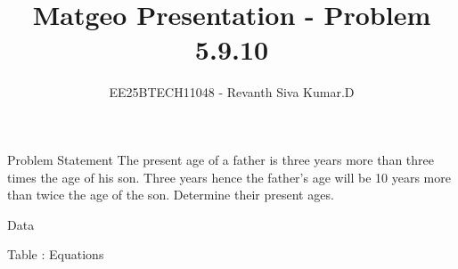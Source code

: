 \documentclass{beamer}
\title{Matgeo Presentation - Problem 5.9.10}
\author{EE25BTECH11048 - Revanth Siva Kumar.D}
\numberwithin{equation}{section}
\theoremstyle{remark}
\begin{document}
\begin{frame}
  \titlepage
\end{frame}

\begin{frame}{Problem Statement}
The present age of a father is three years more than three times the age of his son. Three years hence the father's age will be 10 years more than twice the age of the son. Determine their present ages.

\end{frame}

\begin{frame}{Data}

\begin{table}[h!]
  \centering
  
  \caption*{Table : Equations}
  \label{5.9.2}
\end{table}

\end{frame}
\end{document}
